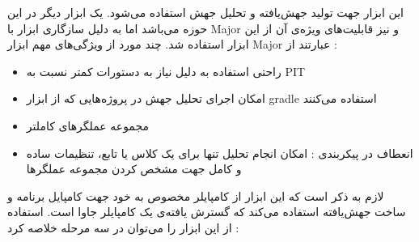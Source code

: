 این ابزار جهت تولید جهش‌یافته و تحلیل جهش استفاده می‌شود. یک ابزار دیگر در این حوزه 
 می‌باشد اما به دلیل سازگاری ابزار  با Major و نیز قابلیت‌های ویژه‌ی آن از این ابزار استفاده شد.
چند مورد از ویژگی‌های مهم ابزار Major عبارتند از \cite{just2014major}:
\begin{itemize}

\item
 راحتی استفاده  به دلیل نیاز به دستورات کمتر نسبت به PIT
\item
امکان اجرای تحلیل جهش در پروژه‌هایی که از ابزار  gradle استفاده می‌کنند
\item
 مجموعه عملگرهای کاملتر
\item
انعطاف در پیکربندی : امکان انجام تحلیل تنها برای یک کلاس یا تابع، تنظیمات ساده و کامل جهت مشخص کردن مجموعه عملگرها
\end{itemize}
لازم به ذکر است که این ابزار از کامپایلر‌ مخصوص به خود جهت کامپایل برنامه و ساخت جهش‌یافته استفاده می‌کند که گسترش یافته‌ی یک کامپایلر جاوا است. 
استفاده از این ابزار را می‌توان در سه مرحله خلاصه کرد :
